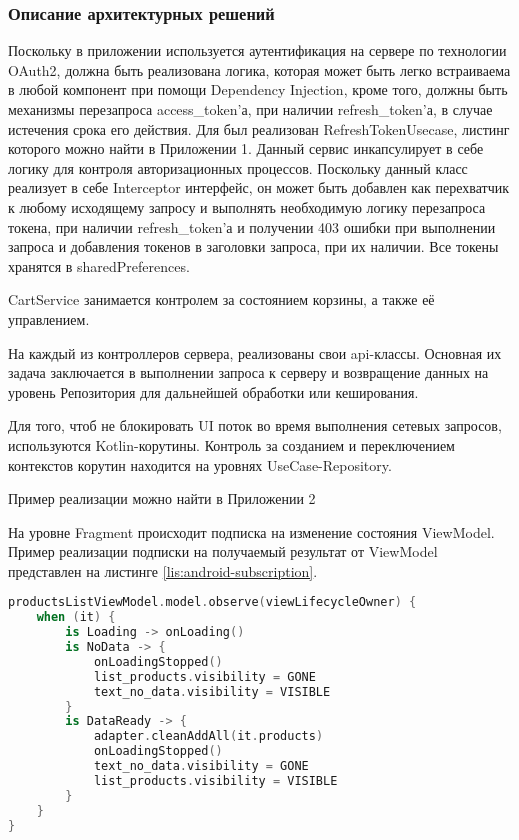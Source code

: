 \subsubsection{Описание архитектурных решений}\indent
{}

Поскольку в приложении используется аутентификация на сервере по технологии OAuth2, должна быть реализована логика, которая может быть легко встраиваема в любой компонент при помощи Dependency Injection, кроме того, должны быть механизмы перезапроса access\_token’а, при наличии refresh\_token’а, в случае истечения срока его действия.
Для был реализован RefreshTokenUsecase, листинг которого можно найти в Приложении 1.
Данный сервис инкапсулирует в себе логику для контроля авторизационных процессов.
Поскольку данный класс реализует в себе Interceptor интерфейс, он может быть добавлен как перехватчик к любому исходящему запросу и выполнять необходимую логику перезапроса токена, при наличии refresh\_token’а и получении 403 ошибки при выполнении запроса и добавления токенов в заголовки запроса, при их наличии.
Все токены хранятся в sharedPreferences.

CartService занимается контролем за состоянием корзины, а также её управлением.

На каждый из контроллеров сервера, реализованы свои api-классы.
Основная их задача заключается в выполнении запроса к серверу и возвращение данных на уровень Репозитория для дальнейшей обработки или кеширования.

Для того, чтоб не блокировать UI поток во время выполнения сетевых запросов, используются Kotlin-корутины.
Контроль за созданием и переключением контекстов корутин находится на уровнях UseCase-Repository.

Пример реализации можно найти в Приложении 2

На уровне Fragment происходит подписка на изменение состояния ViewModel.
Пример реализации подписки на получаемый результат от ViewModel представлен на листинге \ref{lis:android-subscription}.

\begin{lstlisting}[language=Kotlin, captionpos=b,
label={lis:android-subscription},
caption={Пример реализации подписки на ViewModel}
]
productsListViewModel.model.observe(viewLifecycleOwner) {
    when (it) {
        is Loading -> onLoading()
        is NoData -> {
            onLoadingStopped()
            list_products.visibility = GONE
            text_no_data.visibility = VISIBLE
        }
        is DataReady -> {
            adapter.cleanAddAll(it.products)
            onLoadingStopped()
            text_no_data.visibility = GONE
            list_products.visibility = VISIBLE
        }
    }
}
\end{lstlisting}

